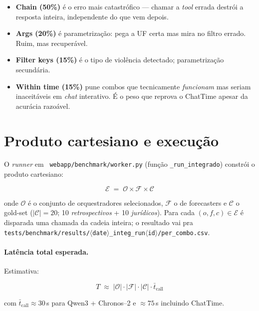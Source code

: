 \documentclass[11pt,a4paper]{article}
\newcommand{\code}[1]{\texttt{\small #1}}
\newcommand{\file}[1]{\texttt{\small\color{black!75} #1}}
\begin{document}
\begin{itemize}[leftmargin=*]
\item \textbf{Chain (50\%)} é o erro mais catastrófico --- chamar a
\emph{tool} errada destrói a resposta inteira, independente do que vem
depois.
\item \textbf{Args (20\%)} é parametrização: pega a UF certa mas mira no
filtro errado. Ruim, mas recuperável.
\item \textbf{Filter keys (15\%)} é o tipo de violência detectado;
parametrização secundária.
\item \textbf{Within time (15\%)} pune combos que tecnicamente
\emph{funcionam} mas seriam inaceitáveis em \emph{chat} interativo. É o
peso que reprova o ChatTime apesar da acurácia razoável.
\end{itemize}

\section{Produto cartesiano e execução}

O \emph{runner} em \file{webapp/benchmark/worker.py} (função
\code{\_run\_integrado}) constrói o produto cartesiano:

\begin{equation}
\mathcal{E} \;=\; \mathcal{O} \times \mathcal{F} \times \mathcal{C}
\end{equation}

onde $\mathcal{O}$ é o conjunto de orquestradores selecionados,
$\mathcal{F}$ o de forecasters e $\mathcal{C}$ o gold-set
(\(|\mathcal{C}| = 20\); 10 \emph{retrospectivos} + 10 \emph{jurídicos}).
Para cada $(o, f, c) \in \mathcal{E}$ é
disparada uma chamada da cadeia inteira; o resultado vai pra
\file{tests/benchmark/results/$\langle$date$\rangle$\_integ\_run$\langle$id$\rangle$/per\_combo.csv}.

\paragraph{Latência total esperada.} Estimativa:

\begin{equation}
T \;\approx\; |\mathcal{O}| \cdot |\mathcal{F}| \cdot |\mathcal{C}| \cdot \bar{t}_\text{call}
\end{equation}

com $\bar{t}_\text{call} \approx 30\,$s para Qwen3 + Chronos--2 e
$\approx 75\,$s incluindo ChatTime.
\end{document}
